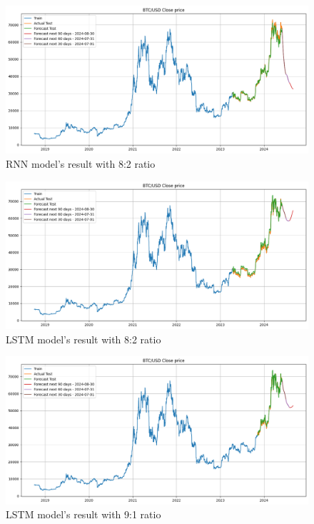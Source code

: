 \documentclass{ieeeojies}
\begin{document}
\begin{figure}[H]
    \centering
    \includegraphics[width=0.8\linewidth]{./././visualize/RNN/BTC-80-20.png}
    \caption{RNN model’s result with 8:2 ratio}
    \label{fig:15}
\end{figure}
\begin{figure}[H]
    \centering
    \includegraphics[width=0.8\linewidth]{./././visualize/LSTM/BTC-80-20.png}
    \caption{LSTM model’s result with 8:2 ratio}
    \label{fig:16}
\end{figure}
\begin{figure}[H]
    \centering
    \includegraphics[width=0.8\linewidth]{./././visualize/LSTM/BTC-90-10.png}
    \caption{LSTM model’s result with 9:1 ratio}
    \label{fig:17}
\end{figure}
\end{document}
